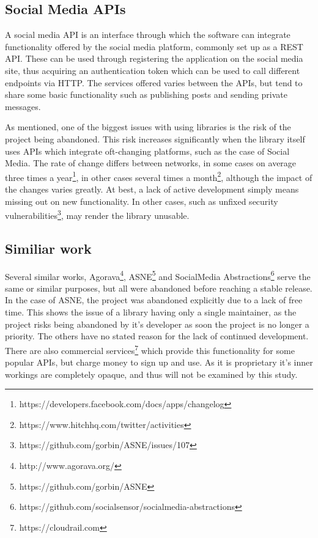 \documentclass{sigchi-alternate}
\begin{document}
\subsection{Social Media APIs}
A social media API is an interface through which the software can integrate functionality offered by the social media platform, commonly set up as a REST API. 
These can be used through registering the application on the social media site, thus acquiring an authentication token which can be used to call different
endpoints via HTTP. The services offered varies between the APIs, but tend to share some basic functionality such as publishing posts and sending private messages.

As mentioned, one of the biggest issues with using libraries is the risk of the project being abandoned. This risk increases significantly when the library
itself uses APIs which integrate oft-changing platforms, such as the case of Social Media. The rate of change differs between networks, in some cases on average
three times a year\footnote{https://developers.facebook.com/docs/apps/changelog}, in other cases several times a month\footnote{https://www.hitchhq.com/twitter/activities},
although the impact of the changes varies greatly. At best, a lack of active development simply means missing out on new functionality. In other cases, such as 
unfixed security vulnerabilities\footnote{https://github.com/gorbin/ASNE/issues/107}, may render the library unusable.

\subsection{Similiar work}
Several similar works, Agorava\footnote{http://www.agorava.org/}, ASNE\footnote{https://github.com/gorbin/ASNE} and 
SocialMedia Abstractions\footnote{https://github.com/socialsensor/socialmedia-abstractions} serve the same or similar purposes, but all were abandoned before reaching a 
stable release. In the case of ASNE, the project was abandoned explicitly due to a lack of free time. This shows the issue of a library having only a single maintainer, 
as the project risks being abandoned by it's developer as soon the project is no longer a priority. The others have no stated reason for the lack of continued development.
There are also commercial services\footnote{https://cloudrail.com} which provide this functionality for some popular APIs, but charge money to sign up 
and use. As it is proprietary it's inner workings are completely opaque, and thus will not be examined by this study.
\end{document}
